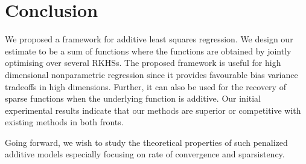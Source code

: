 
\section{Conclusion}
\label{sec:conclusion}

We proposed a framework for additive least squares regression. We design our
estimate to be a sum of functions where the functions are obtained by jointly
optimising over several RKHSs.
The proposed framework is useful for high dimensional nonparametric regression
since it provides favourable bias variance tradeoffs in high dimensions.
Further, it can also be used for the recovery of sparse functions when the
underlying function is additive.
Our initial experimental results indicate that our methods are superior or
competitive with existing methods in both fronts.

Going forward, we wish to study the theoretical properties of such penalized
additive models especially focusing on rate of convergence and sparsistency.


